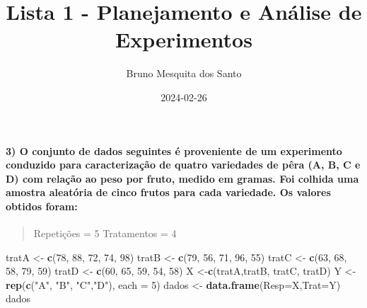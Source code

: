 \documentclass[
]{article}
\title{Lista 1 - Planejamento e Análise de Experimentos}
\author{Bruno Mesquita dos Santo}
\date{2024-02-26}
\newenvironment{Shaded}{\begin{snugshade}}{\end{snugshade}}
\newcommand{\AttributeTok}[1]{\textcolor[rgb]{0.13,0.29,0.53}{#1}}
\newcommand{\DecValTok}[1]{\textcolor[rgb]{0.00,0.00,0.81}{#1}}
\newcommand{\FunctionTok}[1]{\textcolor[rgb]{0.13,0.29,0.53}{\textbf{#1}}}
\newcommand{\NormalTok}[1]{#1}
\newcommand{\OtherTok}[1]{\textcolor[rgb]{0.56,0.35,0.01}{#1}}
\newcommand{\StringTok}[1]{\textcolor[rgb]{0.31,0.60,0.02}{#1}}
\begin{document}
\maketitle

\hypertarget{o-conjunto-de-dados-seguintes-uxe9-proveniente-de-um-experimento-conduzido-para-caracterizauxe7uxe3o-de-quatro-variedades-de-puxeara-a-b-c-e-d-com-relauxe7uxe3o-ao-peso-por-fruto-medido-em-gramas.-foi-colhida-uma-amostra-aleatuxf3ria-de-cinco-frutos-para-cada-variedade.-os-valores-obtidos-foram}{%
\paragraph{3) O conjunto de dados seguintes é proveniente de um
experimento conduzido para caracterização de quatro variedades de pêra
(A, B, C e D) com relação ao peso por fruto, medido em gramas. Foi
colhida uma amostra aleatória de cinco frutos para cada variedade. Os
valores obtidos
foram:}\label{o-conjunto-de-dados-seguintes-uxe9-proveniente-de-um-experimento-conduzido-para-caracterizauxe7uxe3o-de-quatro-variedades-de-puxeara-a-b-c-e-d-com-relauxe7uxe3o-ao-peso-por-fruto-medido-em-gramas.-foi-colhida-uma-amostra-aleatuxf3ria-de-cinco-frutos-para-cada-variedade.-os-valores-obtidos-foram}}

\begin{quote}
Repetições = 5 Tratamentos = 4
\end{quote}

\begin{Shaded}
\begin{Highlighting}[]
\NormalTok{tratA }\OtherTok{\textless{}{-}} \FunctionTok{c}\NormalTok{(}\DecValTok{78}\NormalTok{, }\DecValTok{88}\NormalTok{, }\DecValTok{72}\NormalTok{, }\DecValTok{74}\NormalTok{, }\DecValTok{98}\NormalTok{)}
\NormalTok{tratB }\OtherTok{\textless{}{-}} \FunctionTok{c}\NormalTok{(}\DecValTok{79}\NormalTok{, }\DecValTok{56}\NormalTok{, }\DecValTok{71}\NormalTok{, }\DecValTok{96}\NormalTok{, }\DecValTok{55}\NormalTok{)}
\NormalTok{tratC }\OtherTok{\textless{}{-}} \FunctionTok{c}\NormalTok{(}\DecValTok{63}\NormalTok{, }\DecValTok{68}\NormalTok{, }\DecValTok{58}\NormalTok{, }\DecValTok{79}\NormalTok{, }\DecValTok{59}\NormalTok{)}
\NormalTok{tratD }\OtherTok{\textless{}{-}} \FunctionTok{c}\NormalTok{(}\DecValTok{60}\NormalTok{, }\DecValTok{65}\NormalTok{, }\DecValTok{59}\NormalTok{, }\DecValTok{54}\NormalTok{, }\DecValTok{58}\NormalTok{)}
\NormalTok{X }\OtherTok{\textless{}{-}}\FunctionTok{c}\NormalTok{(tratA,tratB, tratC, tratD)}
\NormalTok{Y }\OtherTok{\textless{}{-}} \FunctionTok{rep}\NormalTok{(}\FunctionTok{c}\NormalTok{(}\StringTok{"A"}\NormalTok{, }\StringTok{"B"}\NormalTok{, }\StringTok{"C"}\NormalTok{,}\StringTok{"D"}\NormalTok{), }\AttributeTok{each =} \DecValTok{5}\NormalTok{)}
\NormalTok{dados }\OtherTok{\textless{}{-}} \FunctionTok{data.frame}\NormalTok{(}\AttributeTok{Resp=}\NormalTok{X,}\AttributeTok{Trat=}\NormalTok{Y)}
\NormalTok{dados}
\end{Highlighting}
\end{Shaded}
\end{document}
